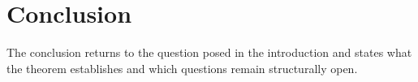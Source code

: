 \section{Conclusion}

The conclusion returns to the question posed in the introduction and states
what the theorem establishes and which questions remain structurally open.
